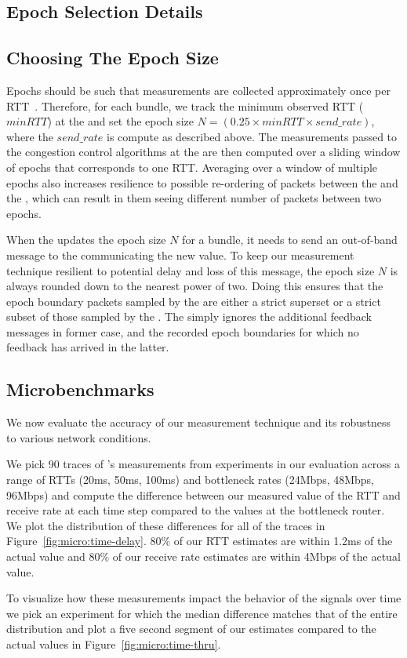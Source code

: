 \begin{Appendix}
\section{Epoch Selection Details}\label{app:epochs}
\subsection{Choosing The Epoch Size}
\label{s:measure:epoch}

Epochs should be such that measurements are collected approximately once per RTT~\cite{ccp}. 
Therefore, for each bundle, we track the minimum observed RTT ($minRTT$) at the \inbox and set the epoch size $N = (0.25 \times minRTT \times send\_rate)$, where the $send\_rate$ is compute as described above. The measurements passed to the congestion control algorithms at the \inbox are then computed over a sliding window of epochs that corresponds to one RTT. Averaging over a window of multiple epochs also increases resilience to possible re-ordering of packets between the \inbox and the \outbox, which can result in them seeing different number of packets between two epochs.

When the \inbox updates the epoch size $N$ for a bundle, it needs to send an out-of-band message to the \outbox communicating the new value. To keep our measurement technique resilient to potential delay and loss of this message, the epoch size $N$ is always rounded down to the nearest power of two. Doing this ensures that the epoch boundary packets sampled by the \outbox are either a strict superset or a strict subset of those sampled by the \inbox. The \inbox simply ignores the additional feedback messages in former case, and the recorded epoch boundaries for which no feedback has arrived in the latter.  

\subsection{Microbenchmarks}
\label{s:measure:microbench}
We now evaluate the accuracy of our measurement technique and its robustness to various network conditions. 

We pick 90 traces of \name's measurements from experiments in our evaluation across a range of RTTs (20ms, 50ms, 100ms) and bottleneck rates (24Mbps, 48Mbps, 96Mbps) and compute the difference between our measured value of the RTT and receive rate at each time step compared to the values at the bottleneck router. We plot the distribution of these differences for all of the traces in Figure~\ref{fig:micro:time-delay}. 80\% of our RTT estimates are within 1.2ms of the actual value and 80\% of our receive rate estimates are within 4Mbps of the actual value. 

To visualize how these measurements impact the behavior of the signals over time we pick an experiment for which the median difference matches that of the entire distribution and plot a five second segment of our estimates compared to the actual values in Figure~\ref{fig:micro:time-thru}.
\end{Appendix}
